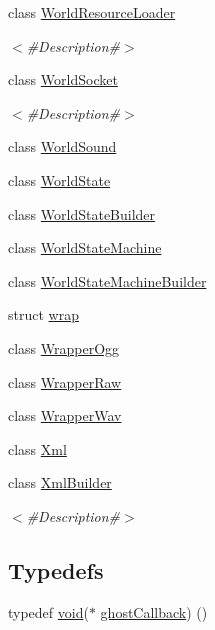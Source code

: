 \begin{DoxyCompactItemize}
class \mbox{\hyperlink{classnjli_1_1_world_resource_loader}{World\+Resource\+Loader}}
\begin{DoxyCompactList}\small\item\em $<$\#\+Description\#$>$ \end{DoxyCompactList}\item 
class \mbox{\hyperlink{classnjli_1_1_world_socket}{World\+Socket}}
\begin{DoxyCompactList}\small\item\em $<$\#\+Description\#$>$ \end{DoxyCompactList}\item 
class \mbox{\hyperlink{classnjli_1_1_world_sound}{World\+Sound}}
\item 
class \mbox{\hyperlink{classnjli_1_1_world_state}{World\+State}}
\item 
class \mbox{\hyperlink{classnjli_1_1_world_state_builder}{World\+State\+Builder}}
\item 
class \mbox{\hyperlink{classnjli_1_1_world_state_machine}{World\+State\+Machine}}
\item 
class \mbox{\hyperlink{classnjli_1_1_world_state_machine_builder}{World\+State\+Machine\+Builder}}
\item 
struct \mbox{\hyperlink{structnjli_1_1wrap}{wrap}}
\item 
class \mbox{\hyperlink{classnjli_1_1_wrapper_ogg}{Wrapper\+Ogg}}
\item 
class \mbox{\hyperlink{classnjli_1_1_wrapper_raw}{Wrapper\+Raw}}
\item 
class \mbox{\hyperlink{classnjli_1_1_wrapper_wav}{Wrapper\+Wav}}
\item 
class \mbox{\hyperlink{classnjli_1_1_xml}{Xml}}
\item 
class \mbox{\hyperlink{classnjli_1_1_xml_builder}{Xml\+Builder}}
\begin{DoxyCompactList}\small\item\em $<$\#\+Description\#$>$ \end{DoxyCompactList}\end{DoxyCompactItemize}
\subsection*{Typedefs}
\begin{DoxyCompactItemize}
\item 
typedef \mbox{\hyperlink{_thread_8h_af1e856da2e658414cb2456cb6f7ebc66}{void}}($\ast$ \mbox{\hyperlink{namespacenjli_a1fa129854a8e7752403465871495fc68}{ghost\+Callback}}) ()
\end{DoxyCompactItemize}
